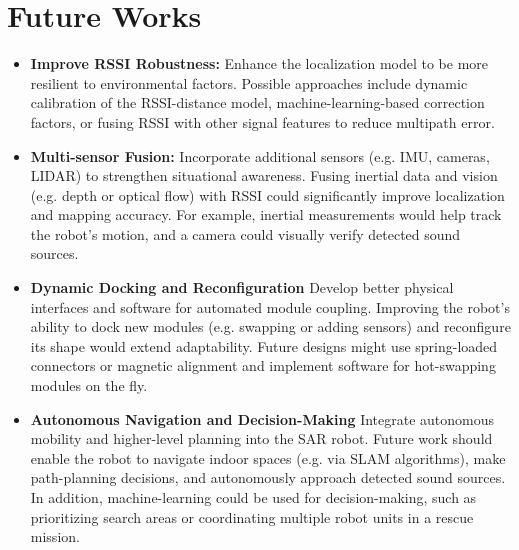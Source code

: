 \section{Future Works}
\begin{itemize}
  \item \textbf{Improve RSSI Robustness:} Enhance the localization model to be more resilient to environmental factors. Possible approaches include dynamic calibration of the RSSI-distance model, machine-learning-based correction factors, or fusing RSSI with other signal features to reduce multipath error.
  \item \textbf{Multi-sensor Fusion:} Incorporate additional sensors (e.g. IMU, cameras, LIDAR) to strengthen situational awareness. Fusing inertial data and vision (e.g. depth or optical flow) with RSSI could significantly improve localization and mapping accuracy. For example, inertial measurements would help track the robot’s motion, and a camera could visually verify detected sound sources.
  \item \textbf{Dynamic Docking and Reconfiguration} Develop better physical interfaces and software for automated module coupling. Improving the robot’s ability to dock new modules (e.g. swapping or adding sensors) and reconfigure its shape would extend adaptability. Future designs might use spring-loaded connectors or magnetic alignment and implement software for hot-swapping modules on the fly.
  \item \textbf{Autonomous Navigation and Decision-Making} Integrate autonomous mobility and higher-level planning into the SAR robot. Future work should enable the robot to navigate indoor spaces (e.g. via SLAM algorithms), make path-planning decisions, and autonomously approach detected sound sources. In addition, machine-learning could be used for decision-making, such as prioritizing search areas or coordinating multiple robot units in a rescue mission.
\end{itemize}

